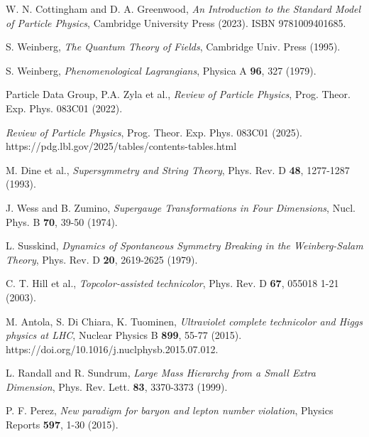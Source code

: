 \documentclass[%
 amsmath,amssymb,
 aps,
prb,
floatfix, showkeys
]{revtex4-2}
\begin{document}
\begin{thebibliography}{99}




W. N. Cottingham and D. A. Greenwood, {\it  An Introduction to the Standard Model of Particle Physics},
Cambridge University Press (2023). ISBN 9781009401685.

  S. Weinberg, {\it The Quantum Theory of Fields}, Cambridge Univ. Press (1995). 

 S. Weinberg, {\it Phenomenological Lagrangians}, Physica A {\bf 96}, 327 (1979).


 Particle Data Group, P.A. Zyla et al., {\it Review of Particle Physics},
  Prog. Theor. Exp. Phys.  083C01 (2022).

  {\it Review of Particle Physics}, 
  Prog. Theor. Exp. Phys.  083C01 (2025). 
https://pdg.lbl.gov/2025/tables/contents-tables.html

  M. Dine et al.,
{\it Supersymmetry and String Theory}, 
  Phys. Rev. D {\bf 48}, 1277-1287 (1993).

 J. Wess and B. Zumino, {\it Supergauge Transformations in Four Dimensions},
    Nucl. Phys. B  {\bf 70}, 39-50 (1974).

 L. Susskind,
    {\it Dynamics of Spontaneous Symmetry Breaking in the Weinberg-Salam Theory},
  Phys. Rev. D  {\bf 20}, 2619-2625 (1979).
  
  C. T. Hill et al.,
{\it Topcolor-assisted technicolor}, 
  Phys. Rev. D {\bf 67}, 055018 1-21 (2003).

M. Antola, S. Di Chiara, K. Tuominen,
{\it Ultraviolet complete technicolor and Higgs physics at LHC},
Nuclear Physics B {\bf 899}, 55-77 (2015). https://doi.org/10.1016/j.nuclphysb.2015.07.012.

  L. Randall and R. Sundrum,
  {\it Large Mass Hierarchy from a Small Extra Dimension}, Phys. Rev. Lett.  {\bf 83}, 3370-3373 (1999).

P. F.  Perez,
{\it New paradigm for baryon and lepton number violation},
Physics Reports {\bf 597},  1-30 (2015).


\end{thebibliography}
\end{document}
